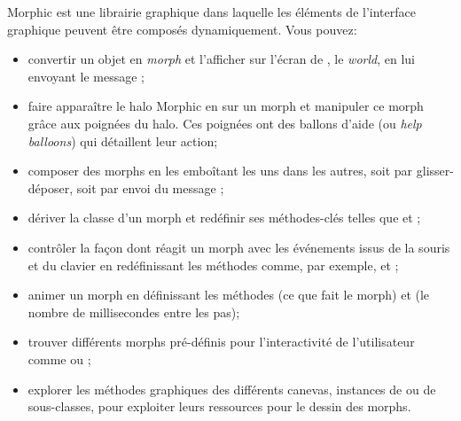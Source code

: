 \documentclass[a4paper,10pt,twoside]{book}
\begin{document}
Morphic est une librairie graphique dans laquelle les éléments de
l'interface graphique peuvent être composés dynamiquement.
Vous pouvez:
\begin{itemize}
  \item convertir un objet en \emph{morph} et l'afficher
    sur l'écran de \pharo, le \emph{world}, en lui envoyant le message
    ;
  \item faire apparaître le halo Morphic en \arelire{\metaclickant}
  sur un morph et manipuler ce morph
    grâce aux poignées du halo. Ces poignées ont des ballons
    d'aide (ou \emph{help balloons}) qui détaillent leur action;
  \item composer des morphs en les emboîtant les uns dans les autres,
    soit par glisser-déposer, soit par envoi du message ;
  \item dériver la classe d'un morph et redéfinir ses
    méthodes-clés telles que  et ;
  \item contrôler la façon dont réagit un morph avec les
    événements issus de la souris et du clavier en redéfinissant les
    méthodes comme, par exemple,  et
    ;
  \item animer un morph en définissant les méthodes 
    (ce que fait le morph) et  (le nombre de
    millisecondes entre les pas);
  \item trouver différents morphs pré-définis pour
    l'interactivité de l'utilisateur comme
     ou ;
  \item explorer les méthodes graphiques des différents canevas,
    instances de  ou de sous-classes,
    pour exploiter leurs ressources pour le dessin des morphs.
\end{itemize}

\ifx\wholebook\relax\else
\end{document}
